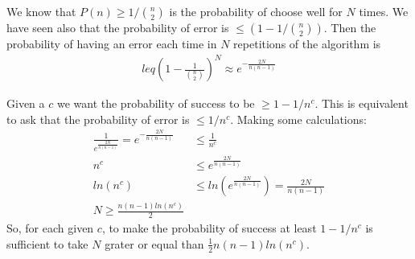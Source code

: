 \documentclass[a4paper]{article}
\begin{document}
We know that $P(n) \geq 1 / \binom{n}{2}$ is the probability of choose well for $N$ times.
We have seen also that the probability of error is $\leq (1 - 1/\binom{n}{2})$.
Then the probability of having an error each time in $N$ repetitions of the algorithm is 
\begin{align*}
leq (1 - \frac{1}{\binom{n}{2}})^N \approx e^{-\frac{2N}{n(n-1)}}
\end{align*}

Given a $c$ we want the probability of success to be $\geq 1 - 1/n^c$.
This is equivalent to ask that the probability of error is $\leq 1/n^c$.
Making some calculations:
\begin{align*}
\frac{1}{e^{\frac{2N}{n(n-1)}}} = e^{-\frac{2N}{n(n-1)}} &\leq \frac{1}{n^c}\\
n^c &\leq e^{\frac{2N}{n(n-1)}}\\
ln(n^c) &\leq ln(e^{\frac{2N}{n(n-1)}}) = \frac{2N}{n(n-1)}\\
N \geq \frac{n(n-1)ln(n^c)}{2}
\end{align*}
So, for each given $c$, to make the probability of success at least $1 - 1/n^c$ is sufficient to take $N$ grater or equal than $\frac{1}{2} n(n-1)ln(n^c)$.
\end{document}
